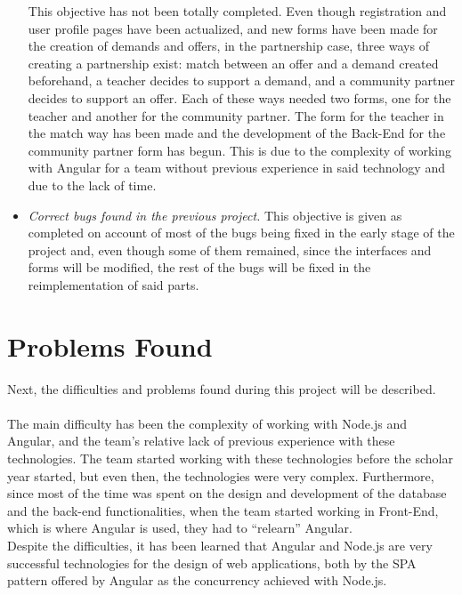 \documentclass[11pt]{book}
\begin{document}
\begin{itemize}
		This objective has not been totally completed. Even though registration and user profile pages have been actualized, and new forms have been made for the creation of demands and offers, in the partnership case, three ways of creating a partnership exist: match between an offer and a demand created beforehand, a teacher decides to support a demand, and a community partner decides to support an offer. Each of these ways needed two forms, one for the teacher and another for the community partner. The form for the teacher in the match way has been made and the development of the Back-End for the community partner form has begun. This is due to the complexity of working with Angular for a team without previous experience in said technology and due to the lack of time.
		\item \emph{Correct bugs found in the previous project.}
		This objective is given as completed on account of most of the bugs being fixed in the early stage of the project and, even though some of them remained, since the interfaces and forms will be modified, the rest of the bugs will be fixed in the reimplementation of said parts.
	\end{itemize}
	
	\section{Problems Found}
	Next, the difficulties and problems found during this project will be described.\\\\
	The main difficulty has been the complexity of working with Node.js and Angular, and the team's relative lack of previous experience with these technologies. The team started working with these technologies before the scholar year started, but even then, the technologies were very complex. Furthermore, since most of the time was spent on the design and development of the database and the back-end functionalities, when the team started working in Front-End, which is where Angular is used, they had to ``relearn'' Angular.\\
	Despite the difficulties, it has been learned that Angular and Node.js are very successful technologies for the design of web applications, both by the SPA pattern offered by Angular as the concurrency achieved with Node.js.
	
\end{document}
